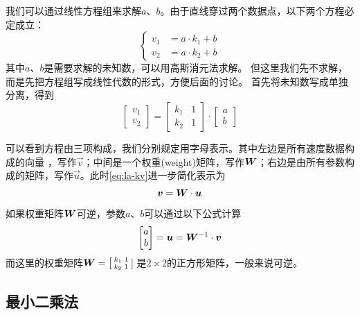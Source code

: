 我们可以通过线性方程组来求解$a$、$b$。由于直线穿过两个数据点，以下两个方程必定成立：
\begin{equation}
    \left\{
    \begin{aligned}
        v_1 &= a\cdot k_1 + b \\
        v_2 &= a\cdot k_2 + b
    \end{aligned}\right.
\end{equation}
其中$a$、$b$是需要求解的未知数，可以用高斯消元法求解。
但这里我们先不求解，而是先把方程组写成线性代数的形式，方便后面的讨论。
首先将未知数写成单独分离，得到
\begin{equation}\label{eq:la-kv}
    \begin{bmatrix}
        v_1\\
        v_2
    \end{bmatrix}=
    \begin{bmatrix}
        k_1 & 1\\
        k_2 & 1
    \end{bmatrix}\cdot
    \begin{bmatrix}
        a\\
        b
    \end{bmatrix}
\end{equation}

可以看到方程由三项构成，我们分别规定用字母表示。其中左边是所有速度数据构成的向量%
，写作$\vec{v}$；中间是一个权重(weight)矩阵，写作$\bm{W}$；右边是由所有参数构成的矩阵，写作$\vec{u}$。此时\cref{eq:la-kv}进一步简化表示为
\begin{equation}
    \bm{v}=\bm{W}\cdot\bm{u}
\end{equation}
如果权重矩阵$\bm{W}$可逆，参数$a$、$b$可以通过以下公式计算
\begin{equation}\label{eq:la-eq}
    \begin{bmatrix}
        a\\
        b
    \end{bmatrix}=
    \bm{u}=\bm{W}^{-1}\cdot\bm{v}
\end{equation}
而这里的权重矩阵$\bm{W}=\big[
\begin{smallmatrix}
    k_1 & 1\\
    k_2 & 1
\end{smallmatrix}$\big]
是$2\times2$的正方形矩阵，一般来说可逆。

\subsection{最小二乘法}

